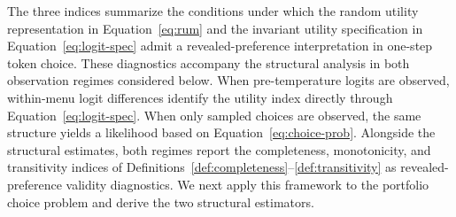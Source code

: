 The three indices summarize the conditions under which the random utility representation in Equation~\eqref{eq:rum} and the invariant utility specification in Equation~\eqref{eq:logit-spec} admit a revealed-preference interpretation in one-step token choice. These diagnostics accompany the structural analysis in both observation regimes considered below. When pre-temperature logits are observed, within-menu logit differences identify the utility index directly through Equation~\eqref{eq:logit-spec}. When only sampled choices are observed, the same structure yields a likelihood based on Equation~\eqref{eq:choice-prob}. Alongside the structural estimates, both regimes report the completeness, monotonicity, and transitivity indices of Definitions~\ref{def:completeness}--\ref{def:transitivity} as revealed-preference validity diagnostics. We next apply this framework to the portfolio choice problem and derive the two structural estimators.
